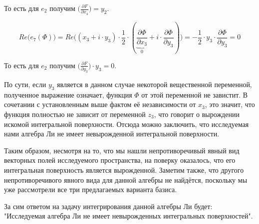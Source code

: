 \documentclass{article}
\begin{document}
То есть для $e_{2}$ получим $\Big(\frac{\partial F}{\partial x_{4}}\Big) = y_{2}$.

\begin{equation*}
    Re\Big(e_{7}(\Phi)\Big) = Re\Big( (x_{3}+i\cdot y_{3}) \cdot \frac{1}{2} \cdot ( \underbrace{\frac{\partial \Phi}{\partial x_{3}}}_{0} + i \cdot \frac{\partial \Phi}{\partial y_{3}}) \Big)
     = - \frac{1}{2} \cdot y_{3} \cdot \frac{\partial \Phi}{\partial y_{3}} = 0
\end{equation*}

То есть для $e_{2}$ получим $\Big(\frac{\partial F}{\partial y_{3}}\Big) \cdot y_{3} = 0$.

По сути, если $y_{3}$ является в данном случае некоторой вещественной переменной, полученное выражение означает, функция $\Phi$ от этой переменной не завистит. В сочетании с установленным выше фактом её независимости от $x_{3}$, это значит, что функция полностью не зависит от переменной $z_{3}$, что говорит о вырождении искомой интегральной поверхности. Отсюда можно заключить, что исследуемая нами алгебра Ли не имеет невырожденной интегральной поверхности.

Таким образом, несмотря на то, что мы нашли непротиворечивый явный вид векторных полей исследуемого пространства, на поверку оказалось, что его интегральная поверхность является вырожденной. Заметим также, что другого непротиворечивого явного вида для данной алгебры не найдётся, поскольку мы уже рассмотрели все три предлагаемых варианта базиса.

За сим ответом на задачу интегрирования данной алгебры Ли будет: "Исследуемая алгебра Ли не имеет невырожденных интегральных поверхностей".

\end{document}
